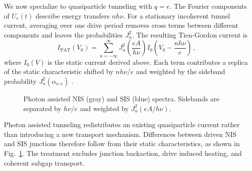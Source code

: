         We now specialize to quasiparticle tunneling with $q=e$. The Fourier components of $U_e(t)$ describe energy transfers $nh\nu$. For a stationary incoherent tunnel current, averaging over one drive period removes cross terms between different components and leaves the probabilities $J_n^2$. The resulting Tien-Gordon current is
        \begin{equation}
            I_\mathrm{PAT}(V_0)
                = \sum_{n=-\infty}^{\infty}
                    J_n^2\!\left(\frac{eA}{h\nu}\right)
                    I_0\!\left(V_0 - \frac{n h\nu}{e}\right)\,,
            \label{eq:micro:pat-iv}
        \end{equation}
        where $I_0(V)$ is the static current derived above. Each term contributes a replica of the static characteristic shifted by $n h\nu/e$ and weighted by the sideband probability $J_n^2(\alpha_{\nu,e})$ \cite{tien_multiphoton_1963}.

        \begin{figure}[t]
            \centering
            \hfill
            \caption{
                Photon assisted NIS (gray) and SIS (blue) spectra. Sidebands are separated by $h\nu/e$ and weighted by $J_n^2(eA/h\nu)$.
                }
            \label{fig:micro:pat}
        \end{figure}

        Photon assisted tunneling redistributes an existing quasiparticle current rather than introducing a new transport mechanism. Differences between driven NIS and SIS junctions therefore follow from their static characteristics, as shown in Fig.~\ref{fig:micro:pat}. The treatment excludes junction backaction, drive induced heating, and coherent subgap transport.
